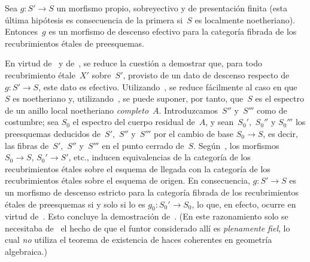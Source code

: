 \begin{theoreme}
\label{IX.4.12}
Sea $g\colon S'\to S$ un morfismo propio, sobreyectivo y de presentación
finita (esta última hipótesis es consecuencia de la primera si~$S$ es
localmente noetheriano). Entonces~$g$ es un morfismo de descenso efectivo
para la categoría fibrada de los recubrimientos étales de preesquemas.
\end{theoreme}

En virtud de~ y de~, se reduce la cuestión a
demostrar que, para todo recubrimiento étale~$X'$ sobre~$S'$, provisto de
un dato de descenso respecto de $g\colon S'\to S$, este dato es efectivo.
Utilizando~, se reduce fácilmente
al caso en que~$S$ es noetheriano y, utilizando~, se puede
suponer, por tanto, que~$S$ es el espectro de un anillo local noetheriano
\emph{completo}~$A$. Introduzcamos~$S''$ y~$S'''$ como de costumbre; sea
$S_0$ el espectro del cuerpo residual de~$A$, y sean~$S_0'$,~$S_0''$ y
$S_0'''$ los preesquemas deducidos de~$S'$,~$S''$ y~$S'''$ por el cambio
de base $S_0\to S$, es decir, las fibras de~$S'$,~$S''$ y~$S'''$ en el
punto cerrado de~$S$. Según~, los morfismos $S_0\to S$,
$S_0'\to S'$, etc., inducen equivalencias de la categoría de los
recubrimientos étales sobre el esquema de llegada con la categoría de los
recubrimientos étales sobre el esquema de origen. En consecuencia,
$g\colon S'\to S$ es un morfismo de descenso estricto para la categoría
fibrada de los recubrimientos étales de preesquemas si y solo si lo es
$g_0\colon S_0'\to S_0$, lo que, en efecto, ocurre en virtud
de~. Esto concluye la demostración de~. (En este
razonamiento solo se necesitaba de~ el hecho de que el funtor
considerado allí es \emph{plenamente fiel}, lo cual \emph{no} utiliza el
teorema de existencia de haces coherentes en geometría algebraica.)
